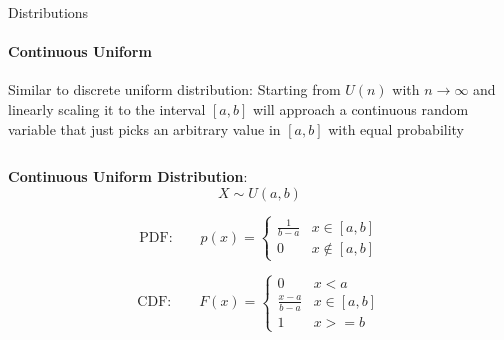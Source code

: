 {    \begin{frame}{Distributions}
        \framesubtitle{Continuous Uniform}
        \vspace*{-1mm}
        Similar to discrete uniform distribution: Starting from $U(n)$ with $n \rightarrow \infty$
        and linearly scaling it to the interval $[a,b]$ will approach a continuous random variable that just
        picks an arbitrary value in $[a,b]$ with equal probability

        \begin{columns}[onlytextwidth]
            \begin{column}{0.5\textwidth}
                \begin{boxed}
                    \textbf{Continuous Uniform Distribution}:
                    $$X \sim U(a, b)$$

                    $$\text{PDF:}\qquad p(x) = \begin{cases} \frac{1}{b-a} & x \in [a, b] \\ 0 & x \not\in [a, b]\end{cases}$$

                    $$\text{CDF:}\qquad F(x) = \begin{cases} 0 & x < a \\ \frac{x-a}{b-a} & x \in [a, b] \\ 1 & x >= b \end{cases}$$


\end{boxed}
\end{column}
\end{columns}
\end{frame}}
